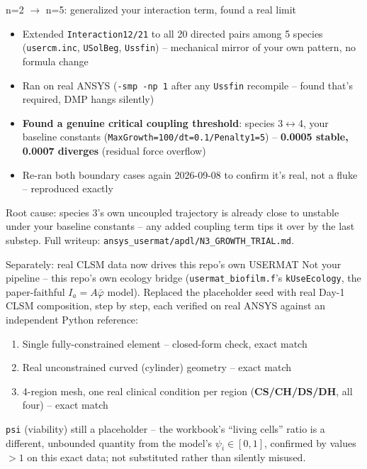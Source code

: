\documentclass[aspectratio=169,11pt]{beamer}
\begin{document}
\begin{frame}{n=2 $\to$ n=5: generalized your interaction term, found a real limit}
\begin{itemize}
  \item Extended \texttt{Interaction12/21} to all 20 directed pairs among
        5 species (\texttt{usercm.inc}, \texttt{USolBeg}, \texttt{Ussfin})
        -- mechanical mirror of your own pattern, no formula change
  \item Ran on real ANSYS (\texttt{-smp -np 1} after any \texttt{Ussfin}
        recompile -- found that's required, DMP hangs silently)
  \item \textbf{Found a genuine critical coupling threshold}: species
        3$\leftrightarrow$4, your baseline constants
        (\texttt{MaxGrowth=100/dt=0.1/Penalty1=5}) --
        \textbf{0.0005 stable, 0.0007 diverges} (residual force overflow)
  \item Re-ran both boundary cases again 2026-09-08 to confirm it's real,
        not a fluke -- reproduced exactly
\end{itemize}
\vspace{4pt}
{\scriptsize Root cause: species 3's own uncoupled trajectory is already
close to unstable under your baseline constants -- any added coupling term
tips it over by the last substep. Full writeup:
\texttt{ansys\_usermat/apdl/N3\_GROWTH\_TRIAL.md}.}
\end{frame}

\begin{frame}{Separately: real CLSM data now drives this repo's own USERMAT}
\small Not your pipeline -- this repo's own ecology bridge
(\texttt{usermat\_biofilm.f}'s \texttt{kUseEcology}, the paper-faithful
$I_a=A\bar\varphi$ model). Replaced the placeholder seed with real Day-1
CLSM composition, step by step, each verified on real ANSYS against an
independent Python reference:
\vspace{4pt}
\begin{enumerate}
  \item Single fully-constrained element -- closed-form check, exact match
  \item Real unconstrained curved (cylinder) geometry -- exact match
  \item 4-region mesh, one real clinical condition per region
        (\textbf{CS/CH/DS/DH}, all four) -- exact match
\end{enumerate}
\vspace{4pt}
\texttt{psi} (viability) still a placeholder -- the workbook's ``living
cells'' ratio is a different, unbounded quantity from the model's
$\psi_i\in[0,1]$, confirmed by values $>1$ on this exact data; not
substituted rather than silently misused.
\end{frame}
\end{document}
